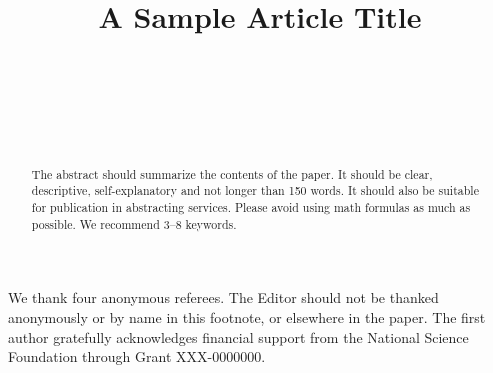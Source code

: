 \documentclass[ecta,nameyear,draft]{econsocart}
\theoremstyle{plain}
\theoremstyle{definition}
\begin{document}
\begin{frontmatter}

\title{A Sample Article Title}

\begin{aug}
%
%
%
\author[add1,add11]{~}
\author[add2]{~}
\author[add2]{~}
\address[add1]{%
,
}

\address[add11]{%
,
}

\address[add2]{%
,
}
\end{aug}

\begin{funding}
We thank four anonymous referees. The Editor should not be thanked anonymously or by name in this footnote, or elsewhere in the paper. The first author gratefully acknowledges
financial support from the National Science Foundation through Grant XXX-0000000.
\end{funding}
%

\begin{abstract}
The abstract should summarize the contents of the paper. It should be clear,
descriptive, self-explanatory and not longer than 150 words. It should also be
suitable for publication in abstracting services. Please avoid using math formulas
as much as possible. We recommend 3--8 keywords.
\end{abstract}


\begin{keyword}
\end{keyword}

\end{frontmatter}
\end{document}
